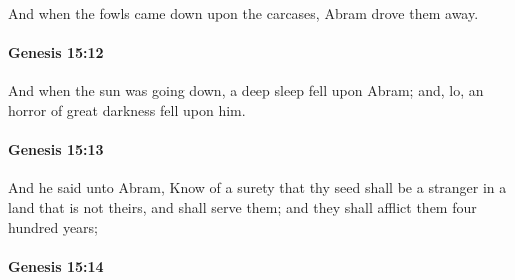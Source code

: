 			And when the fowls came down upon the carcases, Abram drove them away.


		\paragraph{Genesis 15:12} %
			\label{GENESIS-15-12}

			And when the sun was going down, a deep sleep fell upon Abram; and, lo, an horror of great darkness fell upon him.


		\paragraph{Genesis 15:13} %
			\label{GENESIS-15-13}

			And he said unto Abram, Know of a surety that thy seed shall be a stranger in a land that is not theirs, and shall serve them; and they shall afflict them four hundred years;


		\paragraph{Genesis 15:14} %
			\label{GENESIS-15-14}

